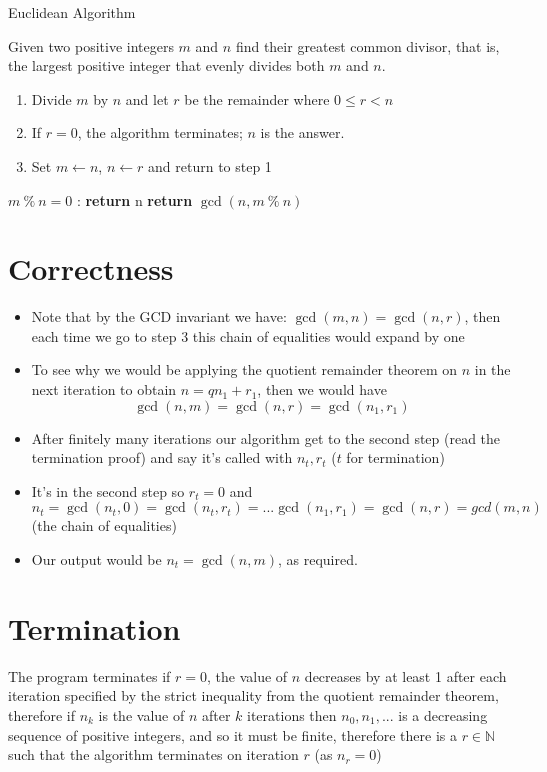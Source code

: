 \documentclass{standalone}
\begin{document}
\begin{defn*}{Euclidean Algorithm}

Given two positive integers $m$ and $n$ find their greatest common divisor, that is, the largest positive integer that evenly divides both $m$ and $n$.

\begin{enumerate}
  \item Divide $m$ by $n$ and let $r$ be the remainder where $0 \le r < n$
  \item If $r =0$, the algorithm terminates; $n$ is the answer.
  \item Set $m \leftarrow n$, $n \leftarrow r$ and return to step 1
\end{enumerate}

\begin{algorithmic}[1]
  \If $ m ~\%~ n = 0$ :
  \State \textbf{return} n 
  \Else
    \State \textbf{return} $ \gcd(n, m ~\%~ n)$ 
  \EndIf
  \EndProcedure
\end{algorithmic}

\section{Correctness}
\begin{itemize}
  \item Note that by the GCD invariant we have: $\gcd(m,n) = \gcd(n,r)$, then each time we go to step 3 this chain of equalities would expand by one
  \item To see why we would be applying the quotient remainder theorem on $n$ in the next iteration to obtain $n = q n_1 + r_1$, then we would have 
  \[
    \gcd(n,m) = \gcd(n,r) = \gcd(n_1, r_1)
  \]
  \item After finitely many iterations our algorithm get to the second step (read the termination proof) and say it's called with $n_t, r_t$ ($t$ for termination)
  \item It's in the second step so  $r_t = 0$ and $n_t = \gcd(n_t,0) = \gcd(n_t, r_t) = ... \gcd(n_1, r_1) = \gcd(n, r) = gcd(m,n)$ (the chain of equalities) 
  \item Our output would be $n_t = \gcd(n,m)$, as required.
\end{itemize}

\section{Termination}

The program terminates if $r = 0$, the value of $n$ decreases by at least 1 after each iteration specified by the strict inequality from the quotient remainder theorem, therefore if $n_k$ is the value of $n$ after $k$ iterations then $n_0, n_1, ...$ is a decreasing sequence of positive integers, and so it must be finite, therefore there is a $r \in \mathbb{N}$ such that the algorithm terminates on iteration $r$ (as $n_r = 0$)

\end{defn*}
\end{document}
